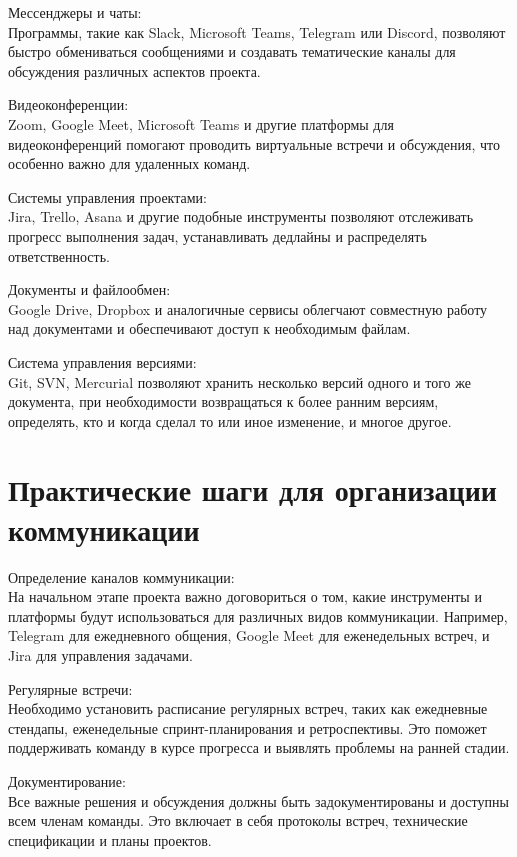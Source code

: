     Мессенджеры и чаты: \\
    Программы, такие как Slack, Microsoft Teams, Telegram или Discord, позволяют быстро обмениваться сообщениями и создавать тематические каналы для обсуждения различных аспектов проекта.

    Видеоконференции: \\
    Zoom, Google Meet, Microsoft Teams и другие платформы для видеоконференций помогают проводить виртуальные встречи и обсуждения, что особенно важно для удаленных команд.
    
    Системы управления проектами: \\
    Jira, Trello, Asana и другие подобные инструменты позволяют отслеживать прогресс выполнения задач, устанавливать дедлайны и распределять ответственность.
    
    Документы и файлообмен: \\
    Google Drive, Dropbox и аналогичные сервисы облегчают совместную работу над документами и обеспечивают доступ к необходимым файлам.
    
    Система управления версиями: \\
    Git, SVN, Mercurial позволяют хранить несколько версий одного и того же документа, при необходимости возвращаться к более ранним версиям, определять, кто и когда сделал то или иное изменение, и многое другое.

    \section{Практические шаги для организации коммуникации}
    Определение каналов коммуникации: \\
    На начальном этапе проекта важно договориться о том, какие инструменты и платформы будут использоваться для различных видов коммуникации. Например, Telegram для ежедневного общения, Google Meet для еженедельных встреч, и Jira для управления задачами.
    
    Регулярные встречи: \\
    Необходимо установить расписание регулярных встреч, таких как ежедневные стендапы, еженедельные спринт-планирования и ретроспективы. Это поможет поддерживать команду в курсе прогресса и выявлять проблемы на ранней стадии.
    
    Документирование: \\
    Все важные решения и обсуждения должны быть задокументированы и доступны всем членам команды. Это включает в себя протоколы встреч, технические спецификации и планы проектов.
    
